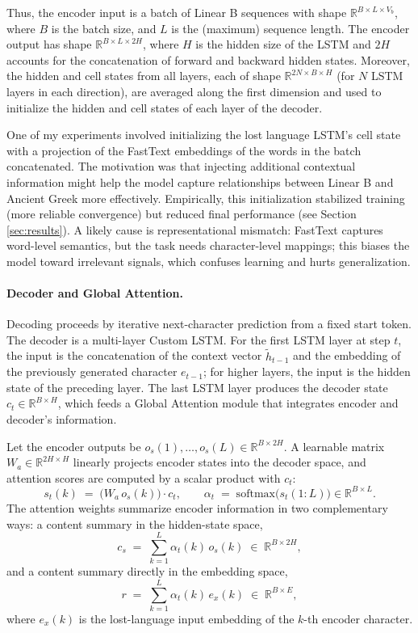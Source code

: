 Thus, the encoder input is a batch of Linear B sequences with shape $\mathbb{R}^{B\times L\times V_b}$, where $B$ is the batch size, and $L$ is the (maximum) sequence length.
The encoder output has shape $\mathbb{R}^{B\times L\times 2H}$, where $H$ is the hidden size of the LSTM and $2H$ accounts for the concatenation of forward and backward hidden states.
Moreover, the hidden and cell states from all layers, each of shape $\mathbb{R}^{2N\times B\times H}$ (for $N$ LSTM layers in each direction), are averaged along the first dimension and used to initialize the hidden and cell states of each layer of the decoder.

One of my experiments involved initializing the lost language LSTM's cell state with a projection of the FastText embeddings of the words in the batch concatenated.
The motivation was that injecting additional contextual information might help the model capture relationships between Linear B and Ancient Greek more effectively.
Empirically, this initialization stabilized training (more reliable convergence) but reduced final performance (see Section \ref{sec:results}).
A likely cause is representational mismatch: FastText captures word-level semantics, but the task needs character-level mappings; this biases the model toward irrelevant signals, which confuses learning and hurts generalization.

\paragraph{Decoder and Global Attention.}
Decoding proceeds by iterative next-character prediction from a fixed start token.
The decoder is a multi-layer Custom LSTM.
For the first LSTM layer at step $t$, the input is the concatenation of the
context vector $\tilde{h}_{t-1}$ and the embedding of the previously generated
character $e_{t-1}$; for higher layers, the input is the hidden state of the
preceding layer.
The last LSTM layer produces the decoder state $c_t\in\mathbb{R}^{B\times H}$,
which feeds a Global Attention module that integrates encoder and decoder's information.

Let the encoder outputs be $o_s(1),\ldots,o_s(L)\in\mathbb{R}^{B\times 2H}$.
A learnable matrix $W_a\in\mathbb{R}^{2H\times H}$ linearly projects encoder
states into the decoder space, and attention scores are computed by a
scalar product with $c_t$:
\[
s_t(k) \;=\; \bigl(W_a\,o_s(k)\bigr)\cdot c_t,
\qquad
\alpha_t \;=\; \mathrm{softmax}\!\bigl(s_t(1{:}L)\bigr)\in\mathbb{R}^{B\times L}.
\]
The attention weights summarize encoder information in two complementary ways:
a content summary in the hidden-state space,
\[
c_s \;=\; \sum_{k=1}^{L} \alpha_t(k)\,o_s(k) \;\in\; \mathbb{R}^{B\times 2H},
\]
and a content summary directly in the embedding space,
\[
r \;=\; \sum_{k=1}^{L} \alpha_t(k)\,e_x(k) \;\in\; \mathbb{R}^{B\times E},
\]
where $e_x(k)$ is the lost-language input embedding of the $k$-th encoder
character.

